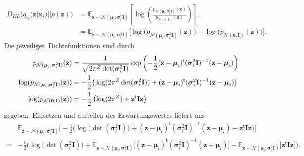 \documentclass[12pt]{article}
\newcommand{\z}{\mathbf{z}}
\begin{document}
	\begin{align*}
	D_{KL}\big(q_{\boldsymbol\phi}(\textbf{z}|\textbf{x}_{i}) || p(\textbf{z})\big) &= \mathbb{E}_{\z\sim\mathcal{N}(\boldsymbol\mu_{i},\boldsymbol\sigma_{i}^{2}\mathbf{I})}\left[\log\left(\frac{p_{\mathcal{N}(\boldsymbol\mu_{i},\boldsymbol\sigma_{i}^{2}\mathbf{I})}(\textbf{z})}{p_{\mathcal{N}(\mathbf{0},\mathbf{I})}(\textbf{z})}\right)\right].\\
	&= \mathbb{E}_{\z\sim\mathcal{N}(\boldsymbol\mu_{i},\boldsymbol\sigma_{i}^{2}\mathbf{I})}\big[\log\big(p_{\mathcal{N}(\boldsymbol\mu_{i},\boldsymbol\sigma_{i}^{2}\mathbf{I})}(\textbf{z})\big)
	- \log\big(p_{\mathcal{N}(\mathbf{0},\mathbf{I})}(\textbf{z})\big)\big].
	\end{align*}
	Die jeweiligen Dichtefunktionen sind durch
	\begin{align*}
	p_{\mathcal{N}(\boldsymbol\mu_{i},\boldsymbol\sigma_{i}^{2}\mathbf{I})}(\textbf{z})&= \frac{1}{\sqrt{2\pi^{Z} \det(\boldsymbol\sigma_{i}^{2}\mathbf{I})}}\exp\left(-\frac{1}{2}(\textbf{z}-\boldsymbol\mu_{i})^{\mathsf{t}}(\boldsymbol\sigma_{i}^{2}\mathbf{I})^{-1}(\textbf{z}-\boldsymbol\mu_{i})\right) \notag \\
	\log(p_{\mathcal{N}(\boldsymbol\mu_{i},\boldsymbol\sigma_{i}^{2}\mathbf{I})}(\textbf{z}))&= -\frac{1}{2}\big(\log(2\pi^{Z} \det(\boldsymbol\sigma_{i}^{2}\mathbf{I}))+(\textbf{z}-\boldsymbol\mu_{i})^{\mathsf{t}}(\boldsymbol\sigma_{i}^{2}\mathbf{I})^{-1}(\textbf{z}-\boldsymbol\mu_{i})\big)\\ \notag 
	\log(p_{\mathcal{N}(\mathbf{0},\mathbf{I})}(\textbf{z}))&= -\frac{1}{2}\left(\log(2\pi^{Z} )+\textbf{z}^{\mathsf{t}}\mathbf{I}\textbf{z}\right)
	\end{align*}
	gegeben. Einsetzen und aufteilen des Erwartungswertes liefert uns
	\begin{align*}
	&\mathbb{E}_{\z\sim\mathcal{N}(\boldsymbol\mu_{i},\boldsymbol\sigma_{i}^{2}\mathbf{I})}\Big[-\frac{1}{2}\Big(\log\big(\det(\boldsymbol\sigma_{i}^{2}\mathbf{I})\big)+(\textbf{z}-\boldsymbol\mu_{i})^{\mathsf{t}}(\boldsymbol\sigma_{i}^{2}\mathbf{I})^{-1}(\textbf{z}-\boldsymbol\mu_{i})-\textbf{z}^{\mathsf{t}}\mathbf{I}\textbf{z}\Big)\Big]\\
	=
	&-\frac{1}{2}\Big(\log\big(\det(\boldsymbol\sigma_{i}^{2}\mathbf{I})\big)+\mathbb{E}_{\z\sim\mathcal{N}(\boldsymbol\mu_{i},\boldsymbol\sigma_{i}^{2}\mathbf{I})}\big[(\textbf{z}-\boldsymbol\mu_{i})^{\mathsf{t}}(\boldsymbol\sigma_{i}^{2}\mathbf{I})^{-1}(\textbf{z}-\boldsymbol\mu_{i})\big]-\mathbb{E}_{\z\sim\mathcal{N}(\boldsymbol\mu_{i},\boldsymbol\sigma_{i}^{2}\mathbf{I})}\big[\textbf{z}^{\mathsf{t}}\mathbf{I}\textbf{z}\big]\Big).
	\end{align*}
\end{document}

